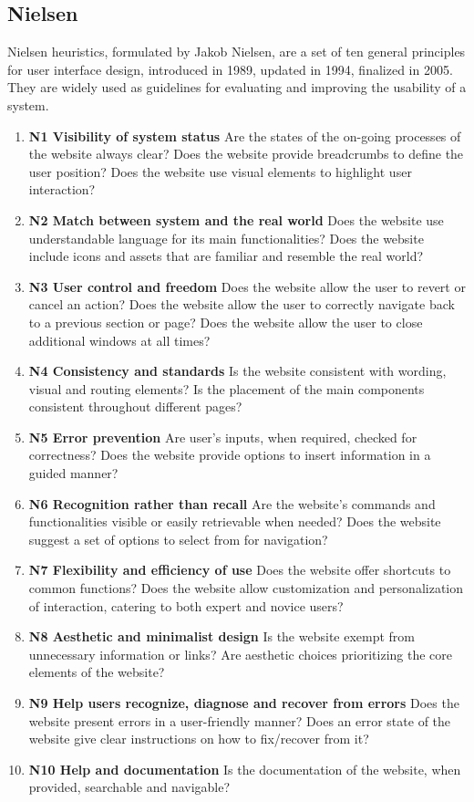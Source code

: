 \subsection{Nielsen}
Nielsen heuristics, formulated by Jakob Nielsen, are a set of ten general principles for user interface design, introduced in 1989, updated in 1994, finalized in 2005. They are widely used as guidelines for evaluating and improving the usability of a system.
\begin{enumerate}
	\item \textbf{N1 Visibility of system status} Are the states of the on-going processes of the website always clear? Does the website provide breadcrumbs to define the user position? Does the website use visual elements to highlight user interaction?
	\item \textbf{N2 Match between system and the real world} Does the website use understandable language for its main functionalities? Does the website include icons and assets that are familiar and resemble the real world?
	\item \textbf{N3 User control and freedom} Does the website allow the user to revert or cancel an action? Does the website allow the user to correctly navigate back to a previous section or page? Does the website allow the user to close additional windows at all times?
	\item \textbf{N4 Consistency and standards} Is the website consistent with wording, visual and routing elements? Is the placement of the main components consistent throughout different pages?
	\item \textbf{N5 Error prevention} Are user's inputs, when required, checked for correctness? Does the website provide options to insert information in a guided manner?
	\item \textbf{N6 Recognition rather than recall} Are the website's commands and functionalities visible or easily retrievable when needed? Does the website suggest a set of options to select from for navigation?
	\item \textbf{N7 Flexibility and efficiency of use} Does the website offer shortcuts to common functions? Does the website allow customization and personalization of interaction, catering to both expert and novice users?
	\item \textbf{N8 Aesthetic and minimalist design} Is the website exempt from unnecessary information or links? Are aesthetic choices prioritizing the core elements of the website?
	\item \textbf{N9 Help users recognize, diagnose and recover from errors} Does the website present errors in a user-friendly manner? Does an error state of the website give clear instructions on how to fix/recover from it?
	\item \textbf{N10 Help and documentation} Is the documentation of the website, when provided, searchable and navigable?
\end{enumerate}

